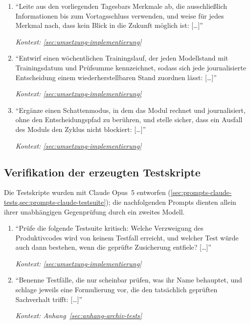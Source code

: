\begin{enumerate}
    \item \enquote{Leite aus den vorliegenden Tagesbars Merkmale ab, die
            ausschließlich Informationen bis zum Vortagsschluss verwenden, und
            weise für jedes Merkmal nach, dass kein Blick in die Zukunft
            möglich ist: [\dots]}
            \par\hfill\textit{Kontext: \cref{sec:umsetzung-implementierung}}

    \item \enquote{Entwirf einen wöchentlichen Trainingslauf, der jeden
            Modellstand mit Trainingsdatum und Prüfsumme kennzeichnet, sodass
            sich jede journalisierte Entscheidung einem wiederherstellbaren
            Stand zuordnen lässt: [\dots]}
            \par\hfill\textit{Kontext: \cref{sec:umsetzung-implementierung}}

    \item \enquote{Ergänze einen Schattenmodus, in dem das Modul rechnet und
            journalisiert, ohne den Entscheidungspfad zu berühren, und stelle
            sicher, dass ein Ausfall des Moduls den Zyklus nicht blockiert:
            [\dots]}
            \par\hfill\textit{Kontext: \cref{sec:umsetzung-implementierung}}
\end{enumerate}

\subsection{Verifikation der erzeugten Testskripte}
\label{sec:prompts-fable-testverifikation}

Die Testskripte wurden mit Claude Opus~5 entworfen
(\cref{sec:prompts-claude-tests,sec:prompts-claude-testsuite}); die
nachfolgenden Prompts dienten allein ihrer unabhängigen Gegenprüfung durch ein
zweites Modell.

\begin{enumerate}
    \item \enquote{Prüfe die folgende Testsuite kritisch: Welche Verzweigung
            des Produktivcodes wird von keinem Testfall erreicht, und welcher
            Test würde auch dann bestehen, wenn die geprüfte Zusicherung
            entfiele? [\dots]}
            \par\hfill\textit{Kontext: \cref{sec:umsetzung-implementierung}}

    \item \enquote{Benenne Testfälle, die nur scheinbar prüfen, was ihr Name
            behauptet, und schlage jeweils eine Formulierung vor, die den
            tatsächlich geprüften Sachverhalt trifft: [\dots]}
            \par\hfill\textit{Kontext: Anhang~\ref{sec:anhang-archiv-tests}}
\end{enumerate}

